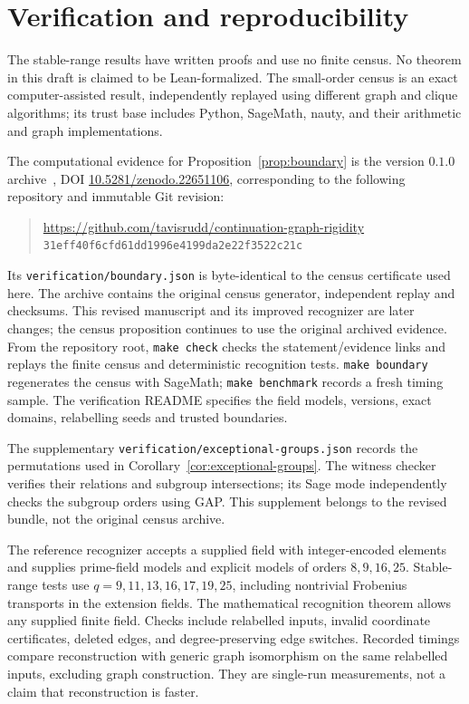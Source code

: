 \documentclass[11pt]{article}
\theoremstyle{definition}
\theoremstyle{remark}
\begin{document}
\appendix
\section{Verification and reproducibility}\label{sec:verification}

The stable-range results have written proofs and use no finite census.
No theorem in this draft is claimed to be Lean-formalized. The small-order
census is an exact computer-assisted result, independently replayed using
different graph and clique algorithms; its trust base includes Python,
SageMath, nauty, and their arithmetic and graph implementations.

The computational evidence for Proposition~\ref{prop:boundary} is the
version $0.1.0$ archive~\cite{CensusArtifact}, DOI
\href{https://doi.org/10.5281/zenodo.22651106}{10.5281/zenodo.22651106},
corresponding to the following repository and immutable Git revision:
\begin{quote}\small
\url{https://github.com/tavisrudd/continuation-graph-rigidity}\\
\texttt{31eff40f6cfd61dd1996e4199da2e22f3522c21c}
\end{quote}
Its \texttt{verification/boundary.json} is byte-identical to the census
certificate used here. The archive contains the original census generator,
independent replay and checksums. This revised manuscript and its improved
recognizer are later changes; the census proposition continues to use the
original archived evidence. From the repository root,
\texttt{make check} checks the statement/evidence links and replays the
finite census and deterministic recognition tests. \texttt{make boundary}
regenerates the census with SageMath; \texttt{make benchmark} records a
fresh timing sample. The verification README specifies the field models,
versions, exact domains, relabelling seeds and trusted boundaries.

The supplementary \texttt{verification/exceptional-groups.json} records
the permutations used in Corollary~\ref{cor:exceptional-groups}.
The witness checker verifies their relations and subgroup intersections;
its Sage mode independently checks the subgroup orders using GAP.
This supplement belongs to the revised bundle, not the original census archive.

The reference recognizer accepts a supplied field with integer-encoded
elements and supplies prime-field models and explicit models of orders
$8,9,16,25$. Stable-range tests use $q=9,11,13,16,17,19,25$, including
nontrivial Frobenius transports in the extension fields. The
mathematical recognition theorem allows any supplied finite field.
Checks include relabelled inputs, invalid coordinate certificates,
deleted edges, and degree-preserving edge switches. Recorded timings
compare reconstruction with generic graph isomorphism on the same
relabelled inputs, excluding graph construction. They are single-run
measurements, not a claim that reconstruction is faster.
\end{document}
